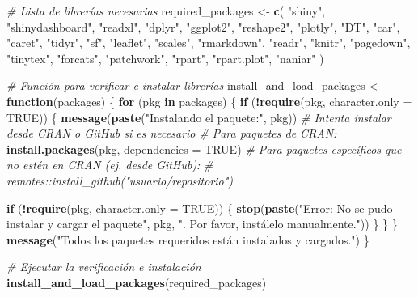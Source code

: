 \documentclass[
]{article}
\newenvironment{Shaded}{\begin{snugshade}}{\end{snugshade}}
\newcommand{\AttributeTok}[1]{\textcolor[rgb]{0.13,0.29,0.53}{#1}}
\newcommand{\CommentTok}[1]{\textcolor[rgb]{0.56,0.35,0.01}{\textit{#1}}}
\newcommand{\ConstantTok}[1]{\textcolor[rgb]{0.56,0.35,0.01}{#1}}
\newcommand{\ControlFlowTok}[1]{\textcolor[rgb]{0.13,0.29,0.53}{\textbf{#1}}}
\newcommand{\FunctionTok}[1]{\textcolor[rgb]{0.13,0.29,0.53}{\textbf{#1}}}
\newcommand{\NormalTok}[1]{#1}
\newcommand{\OtherTok}[1]{\textcolor[rgb]{0.56,0.35,0.01}{#1}}
\newcommand{\SpecialCharTok}[1]{\textcolor[rgb]{0.81,0.36,0.00}{\textbf{#1}}}
\newcommand{\StringTok}[1]{\textcolor[rgb]{0.31,0.60,0.02}{#1}}
\begin{document}
\begin{Shaded}
\begin{Highlighting}[]
\CommentTok{\# Lista de librerías necesarias}
\NormalTok{required\_packages }\OtherTok{\textless{}{-}} \FunctionTok{c}\NormalTok{(}
  \StringTok{"shiny"}\NormalTok{, }\StringTok{"shinydashboard"}\NormalTok{, }\StringTok{"readxl"}\NormalTok{, }\StringTok{"dplyr"}\NormalTok{, }\StringTok{"ggplot2"}\NormalTok{,}
  \StringTok{"reshape2"}\NormalTok{, }\StringTok{"plotly"}\NormalTok{, }\StringTok{"DT"}\NormalTok{, }\StringTok{"car"}\NormalTok{, }\StringTok{"caret"}\NormalTok{, }\StringTok{"tidyr"}\NormalTok{,}
  \StringTok{"sf"}\NormalTok{, }\StringTok{"leaflet"}\NormalTok{, }\StringTok{"scales"}\NormalTok{, }\StringTok{"rmarkdown"}\NormalTok{, }\StringTok{"readr"}\NormalTok{,}
  \StringTok{"knitr"}\NormalTok{, }\StringTok{"pagedown"}\NormalTok{, }\StringTok{"tinytex"}\NormalTok{, }\StringTok{"forcats"}\NormalTok{, }\StringTok{"patchwork"}\NormalTok{,}
  \StringTok{"rpart"}\NormalTok{, }\StringTok{"rpart.plot"}\NormalTok{, }\StringTok{"naniar"}
\NormalTok{)}

\CommentTok{\# Función para verificar e instalar librerías}
\NormalTok{install\_and\_load\_packages }\OtherTok{\textless{}{-}} \ControlFlowTok{function}\NormalTok{(packages) \{}
  \ControlFlowTok{for}\NormalTok{ (pkg }\ControlFlowTok{in}\NormalTok{ packages) \{}
    \ControlFlowTok{if}\NormalTok{ (}\SpecialCharTok{!}\FunctionTok{require}\NormalTok{(pkg, }\AttributeTok{character.only =} \ConstantTok{TRUE}\NormalTok{)) \{}
      \FunctionTok{message}\NormalTok{(}\FunctionTok{paste}\NormalTok{(}\StringTok{"Instalando el paquete:"}\NormalTok{, pkg))}
      \CommentTok{\# Intenta instalar desde CRAN o GitHub si es necesario}
      \CommentTok{\# Para paquetes de CRAN:}
      \FunctionTok{install.packages}\NormalTok{(pkg, }\AttributeTok{dependencies =} \ConstantTok{TRUE}\NormalTok{)}
      \CommentTok{\# Para paquetes específicos que no estén en CRAN (ej. desde GitHub):}
      \CommentTok{\# remotes::install\_github("usuario/repositorio")}

      \ControlFlowTok{if}\NormalTok{ (}\SpecialCharTok{!}\FunctionTok{require}\NormalTok{(pkg, }\AttributeTok{character.only =} \ConstantTok{TRUE}\NormalTok{)) \{}
        \FunctionTok{stop}\NormalTok{(}\FunctionTok{paste}\NormalTok{(}\StringTok{"Error: No se pudo instalar y cargar el paquete"}\NormalTok{, pkg, }\StringTok{". }
\StringTok{                   Por favor, instálelo manualmente."}\NormalTok{))}
\NormalTok{      \}}
\NormalTok{    \}}
\NormalTok{  \}}
  \FunctionTok{message}\NormalTok{(}\StringTok{"Todos los paquetes requeridos están instalados y cargados."}\NormalTok{)}
\NormalTok{\}}

\CommentTok{\# Ejecutar la verificación e instalación}
\FunctionTok{install\_and\_load\_packages}\NormalTok{(required\_packages)}
\end{Highlighting}
\end{Shaded}
\end{document}
